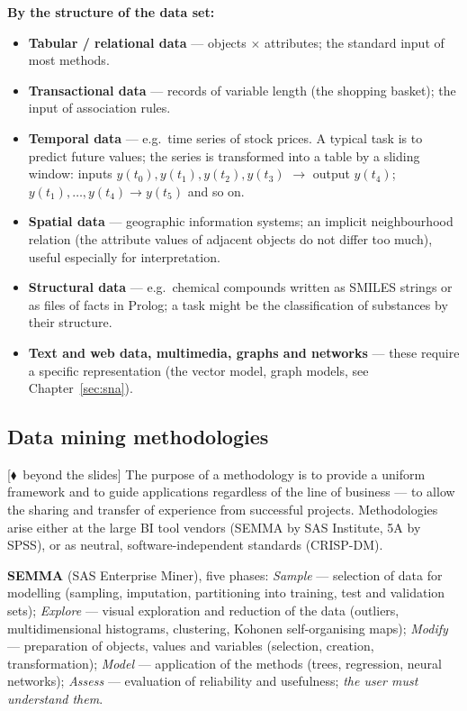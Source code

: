 \documentclass[11pt,a4paper]{article}
\theoremstyle{definition}
\newcommand{\mimo}{\textcolor{markcol}{\textsf{\footnotesize[$\blacklozenge$~beyond the slides]}}}
\begin{document}
\textbf{By the structure of the data set:}
\begin{itemize}
\item \textbf{Tabular / relational data} --- objects $\times$ attributes; the standard input of
      most methods.
\item \textbf{Transactional data} --- records of variable length (the shopping basket); the
      input of association rules.
\item \textbf{Temporal data} --- e.g.\ time series of stock prices. A typical task is to predict
      future values; the series is transformed into a table by a sliding window: inputs
      $y(t_0),y(t_1),y(t_2),y(t_3)$ $\to$ output $y(t_4)$; $y(t_1),\dots,y(t_4)\to y(t_5)$
      and so on.
\item \textbf{Spatial data} --- geographic information systems; an implicit neighbourhood
      relation (the attribute values of adjacent objects do not differ too much), useful
      especially for interpretation.
\item \textbf{Structural data} --- e.g.\ chemical compounds written as SMILES strings or as
      files of facts in Prolog; a task might be the classification of substances by their
      structure.
\item \textbf{Text and web data, multimedia, graphs and networks} --- these require a specific
      representation (the vector model, graph models, see Chapter~\ref{sec:sna}).
\end{itemize}

\subsection{Data mining methodologies}
\label{ssec:metodologie}

\mimo{} The purpose of a methodology is to provide a uniform framework and to guide
applications regardless of the line of business --- to allow the sharing and transfer of
experience from successful projects. Methodologies arise either at the large BI tool vendors
(SEMMA by SAS Institute, 5A by SPSS), or as neutral, software-independent standards (CRISP-DM).

\textbf{SEMMA} (SAS Enterprise Miner), five phases: \emph{Sample} --- selection of data for
modelling (sampling, imputation, partitioning into training, test and validation sets);
\emph{Explore} --- visual exploration and reduction of the data (outliers, multidimensional
histograms, clustering, Kohonen self-organising maps); \emph{Modify} --- preparation of objects,
values and variables (selection, creation, transformation); \emph{Model} --- application of the
methods (trees, regression, neural networks); \emph{Assess} --- evaluation of reliability and
usefulness; \emph{the user must understand them}.
\end{document}
